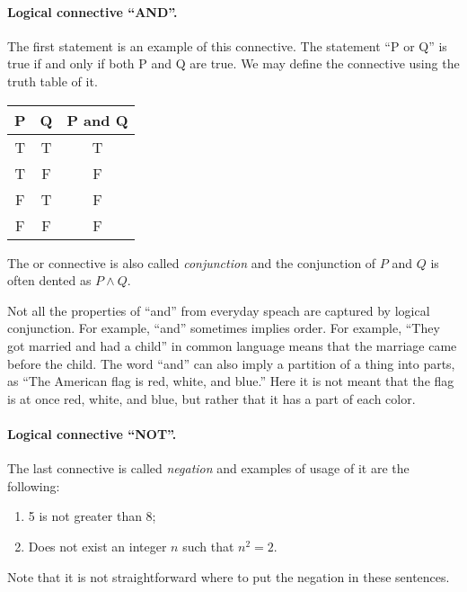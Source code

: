 \paragraph{Logical connective ``AND''.}
The first statement is an example of this connective. The statement ``P or Q''
is true if and only if both P and Q are true. We may define the
connective using the truth table of it.
\begin{center}
  \begin{tabular}{c | c | c}
    P & Q & P and Q \\
    \hline
    T & T & T \\
    T & F & F \\
    F & T & F \\
    F & F & F
  \end{tabular}
\end{center}

The or connective is also called \textit{conjunction} and the conjunction of
$P$ and $Q$ is often dented as $P \land Q$.

\begin{warning}
  Not all the properties of ``and'' from everyday speach are captured by
  logical conjunction. For example, ``and'' sometimes implies order. For
  example, ``They got married and had a child'' in common language means that
  the marriage came before the child. The word ``and'' can also imply a
  partition of a thing into parts, as ``The American flag is red, white, and
  blue.'' Here it is not meant that the flag is at once red, white, and blue,
  but rather that it has a part of each color.
\end{warning}

\paragraph{Logical connective ``NOT''.}
The last connective is called \textit{negation} and examples of usage of it are
the following:
\begin{enumerate}
  \item 5 is not greater than 8;
  \item Does not exist an integer $n$ such that $n^2 = 2$.
\end{enumerate}

Note that it is not straightforward where to put the negation in these
sentences.

